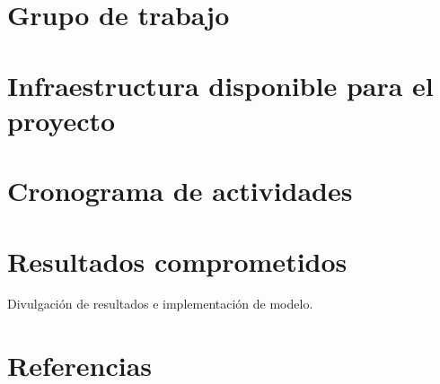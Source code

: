 \documentclass[12pt,letterpaper,final,titlepage]{article}
\begin{document}
\maketitle

\tableofcontents





\section {Grupo de trabajo}

\section {Infraestructura disponible para el proyecto}

\section {Cronograma de actividades}

\section {Resultados comprometidos}
Divulgación de resultados e implementación de modelo.

\newpage
\section {Referencias}
\printbibliography[heading=none]
\end{document}
